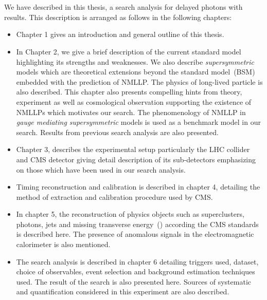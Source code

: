\paragraph*{} \mbox{}\\
We have described in this thesis, a search analysis for delayed photons with results. This description is arranged as follows in the following chapters: 
\begin{itemize}
\item Chapter 1 gives an introduction and general outline of this thesis. 

\item In Chapter 2, we give a brief description of the current standard model highlighting its strengths and weaknesses. We also describe \textit{supersymmetric} models which are theoretical extensions beyond the standard model~(BSM) embedded with the prediction of NMLLP.
The physics of long-lived particle is also described.
This chapter also presents compelling hints from theory, experiment as well as cosmological observation supporting the existence of NMLLPs which motivates our search.
The phenomenology of NMLLP in \textit{gauge mediating supersymmetric} models is used as a benchmark model in our search. Results from previous search analysis are also presented. 

\item  Chapter 3,  describes the experimental setup particularly the LHC collider and CMS detector giving detail description of its sub-detectors emphasizing on those which have been used in our search analysis.

\item Timing reconstruction and calibration is described in chapter 4, detailing the method of extraction and calibration procedure used by CMS.  
\item In chapter 5, the reconstruction of physics objects such as superclusters, photons, jets and missing transverse energy~(\MET) according the CMS standards is described here. The presence of anomalous signals in the electromagnetic calorimeter is also mentioned.

\item The search analysis is described in chapter 6 detailing triggers used, dataset, choice of observables, event selection and background estimation techniques used. The result of the search is also presented here. Sources of systematic and quantification considered in this experiment are also described.


\end{itemize}
